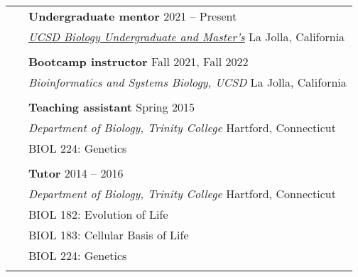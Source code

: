 \documentclass[letterpaper, 11pt]{article}
\begin{document}
\begin{longtable}{p{1.6in}p{4.9in}}
  

{\color{OliveGreen}{Teaching / Mentorship}} 
& \textbf{Undergraduate mentor} \hfill 2021 -- Present \\
& \href{https://www.bummpucsd.org/about}{\textit{UCSD Biology Undergraduate and Master's}} \hfill La Jolla, California \\
& \\

& \textbf{Bootcamp instructor} \hfill Fall 2021, Fall 2022 \\\
& \textit{Bioinformatics and Systems Biology, UCSD} \hfill La Jolla, California \\
& \\

& \textbf{Teaching assistant} \hfill Spring 2015 \\
& \textit{Department of Biology, Trinity College} \hfill Hartford, Connecticut \\
& BIOL 224: Genetics \\
& \\

& \textbf{Tutor} \hfill 2014 -- 2016 \\
& \textit{Department of Biology, Trinity College} \hfill Hartford, Connecticut \\
& BIOL 182: Evolution of Life \\
& BIOL 183: Cellular Basis of Life \\
& BIOL 224: Genetics \\
& \\




\end{longtable}
\end{document}
